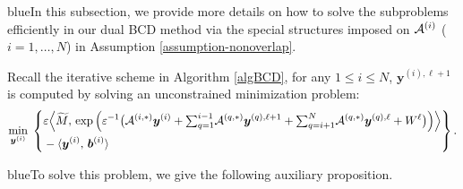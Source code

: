 \documentclass[10pt]{article}
\newcommand{\blue}[1]{\begin{color}{blue}#1\end{color}}
\newcommand{\cA}{{\cal A}}
\newcommand{\inprod}[2]{\langle #1 , #2 \rangle }
\def\inprod#1#2{\langle#1,\,#2\rangle}
\def\Inprod#1#2{\Big\langle#1,\,#2\Big\rangle}
\begin{document}
\blue{In this subsection, we provide more details on how to solve the subproblems efficiently in our dual BCD method via the special structures imposed on $\cA^{(i)}$ ($i=1,\dots,N$) in Assumption \ref{assumption-nonoverlap}.} Recall the iterative scheme in Algorithm \ref{algBCD}, for any $1\leq i\leq N$, $\bm{y}^{(i),\ell+1}$ is computed by solving an unconstrained minimization problem:
\begin{equation}\label{eq-yhat}
\begin{aligned}
\min_{\bm{y}^{(i)}} \; \left\{
\begin{aligned}
&\varepsilon \Inprod{\widetilde{M}}{ \exp \Big( \varepsilon^{-1}
\big( \cA^{(i,*)} \bm{y}^{(i)} + {\textstyle\sum_{q=1}^{i-1}}\cA^{(q,*)} \bm{y}^{(q),\ell+1} +
{\textstyle\sum_{q=i+1}^{N}} \cA^{(q,*)} \bm{y}^{(q),\ell}+ W^\ell \big)\Big)} \\
&-\inprod{\bm{y}^{(i)}}{\bm{b}^{(i)}}
\end{aligned}
\right\}.
\end{aligned}
\end{equation}
\blue{To solve this problem, we give the following auxiliary proposition.}
\end{document}
